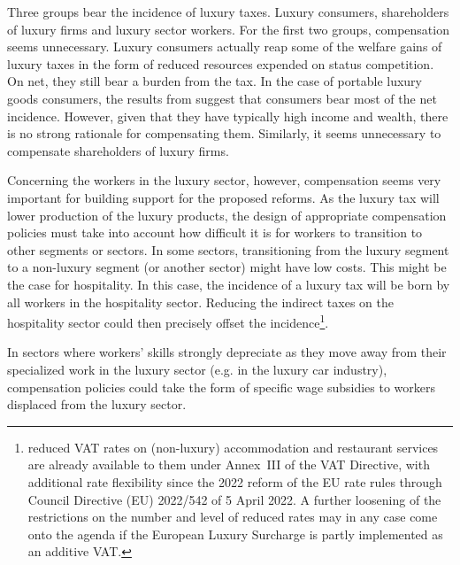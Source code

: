 \documentclass[../../main]{subfiles}
\begin{document}
Three groups bear the incidence of luxury taxes. Luxury consumers, shareholders of luxury firms and luxury sector workers. For the first two groups, compensation seems unnecessary. Luxury consumers actually reap some of the welfare gains of luxury taxes in the form of reduced resources expended on status competition. On net, they still bear a burden from the tax. In the case of portable luxury goods consumers, the results from \cite{Xie2026} suggest that consumers bear most of the net incidence. However, given that they have typically high income and wealth, there is no strong rationale for compensating them. Similarly, it seems unnecessary to compensate shareholders of luxury firms.

Concerning the workers in the luxury sector, however, compensation seems very important for building support for the proposed reforms. As the luxury tax will lower production of the luxury products, the design of appropriate compensation policies must take into account how difficult it is for workers to transition to other segments or sectors. In some sectors, transitioning from the luxury segment to a non-luxury segment (or another sector) might have low costs. This might be the case for hospitality. In this case, the incidence of a luxury tax will be born by all workers in the hospitality sector. Reducing the indirect taxes on the hospitality sector could then precisely offset the incidence\footnote{reduced VAT rates on (non-luxury) accommodation and restaurant services are already available to them under Annex~III of the VAT Directive, with additional rate flexibility since the 2022 reform of the EU rate rules through Council Directive (EU) 2022/542 of 5 April 2022. A further loosening of the restrictions on the number and level of reduced rates may in any case come onto the agenda if the European Luxury Surcharge is partly implemented as an additive VAT.}.

In sectors where workers' skills strongly depreciate as they move away from their specialized work in the luxury sector (e.g. in the luxury car industry), compensation policies could take the form of specific wage subsidies to workers displaced from the luxury sector. 
\end{document}
